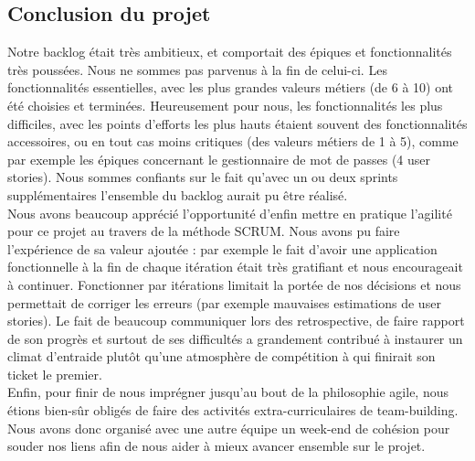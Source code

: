 \documentclass[10pt,a4paper]{article}
\begin{document}
\subsection{Conclusion du projet}

Notre backlog était très ambitieux, et comportait des épiques et fonctionnalités très poussées. Nous ne sommes pas parvenus à la fin de celui-ci. Les fonctionnalités essentielles, avec les plus grandes valeurs métiers (de 6 à 10) ont été choisies et terminées. Heureusement pour nous, les fonctionnalités les plus difficiles, avec les points d’efforts les plus hauts étaient souvent des fonctionnalités accessoires, ou en tout cas moins critiques (des valeurs métiers de 1 à 5), comme par exemple les épiques concernant le gestionnaire de mot de passes (4 user stories). Nous sommes confiants sur le fait qu’avec un ou deux sprints supplémentaires l’ensemble du backlog aurait pu être réalisé. \\

Nous avons beaucoup apprécié l’opportunité d’enfin mettre en pratique l’agilité pour ce projet au travers de la méthode SCRUM. Nous avons pu faire l’expérience de sa valeur ajoutée : par exemple le fait d’avoir une application fonctionnelle à la fin de chaque itération était très gratifiant et nous encourageait à continuer. Fonctionner par itérations limitait la portée de nos décisions et nous permettait de corriger les erreurs (par exemple mauvaises estimations de user stories). Le fait de beaucoup communiquer lors des retrospective, de faire rapport de son progrès et surtout de ses difficultés a grandement contribué à instaurer un climat d’entraide plutôt qu’une atmosphère de compétition à qui finirait son ticket le premier. \\

Enfin, pour finir de nous imprégner jusqu’au bout de la philosophie agile, nous étions bien-sûr obligés de faire des activités extra-curriculaires de team-building. Nous avons donc organisé avec une autre équipe un week-end de cohésion pour souder nos liens afin de nous aider à mieux avancer ensemble sur le projet.
\end{document}
